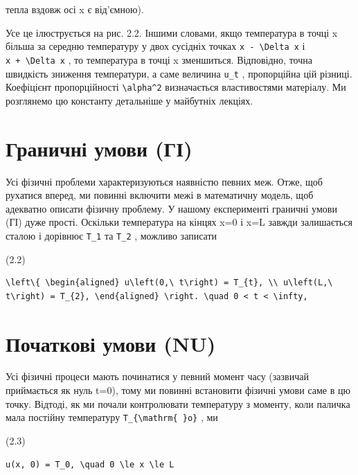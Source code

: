 \documentclass[
  ukrainian,
]{article}
\begin{document}
тепла вздовж осі x є від'ємною).

Усе це ілюструється на рис. 2.2. Іншими словами, якщо температура в
точці x більша за середню температуру у двох сусідніх точках
\texttt{x\ -\ \textbackslash{}Delta\ x} і
\texttt{x\ +\ \textbackslash{}Delta\ x} , то температура в точці x
зменшиться. Відповідно, точна швидкість зниження температури, а саме
величина \texttt{u\_t} , пропорційна цій різниці. Коефіцієнт
пропорційності \texttt{\textbackslash{}alpha\^{}2} визначається
властивостями матеріалу. Ми розглянемо цю константу детальніше у
майбутніх лекціях.

\section{Граничні умови
(ГІ)}\label{ux433ux440ux430ux43dux438ux447ux43dux456-ux443ux43cux43eux432ux438-ux433ux456}

Усі фізичні проблеми характеризуються наявністю певних меж. Отже, щоб
рухатися вперед, ми повинні включити межі в математичну модель, щоб
адекватно описати фізичну проблему. У нашому експерименті граничні умови
(ГІ) дуже прості. Оскільки температура на кінцях x=0 і x=L завжди
залишається сталою і дорівнює \texttt{T\_1} та \texttt{T\_2} , можливо
записати

(2.2)

\begin{verbatim}
\left\{ \begin{aligned} u\left(0,\ t\right) = T_{t}, \\ u\left(L,\ t\right) = T_{2}, \end{aligned} \right. \quad 0 < t < \infty,
\end{verbatim}

\section{Початкові умови
(NU)}\label{ux43fux43eux447ux430ux442ux43aux43eux432ux456-ux443ux43cux43eux432ux438-nu}

Усі фізичні процеси мають починатися у певний момент часу (зазвичай
приймається як нуль t=0), тому ми повинні встановити фізичні умови саме
в цю точку. Відтоді, як ми почали контролювати температуру з моменту,
коли паличка мала постійну температуру
\texttt{T\_\{\textbackslash{}mathrm\{\ \}o\}} , ми

(2.3)

\begin{verbatim}
u(x, 0) = T_0, \quad 0 \le x \le L
\end{verbatim}
\end{document}

